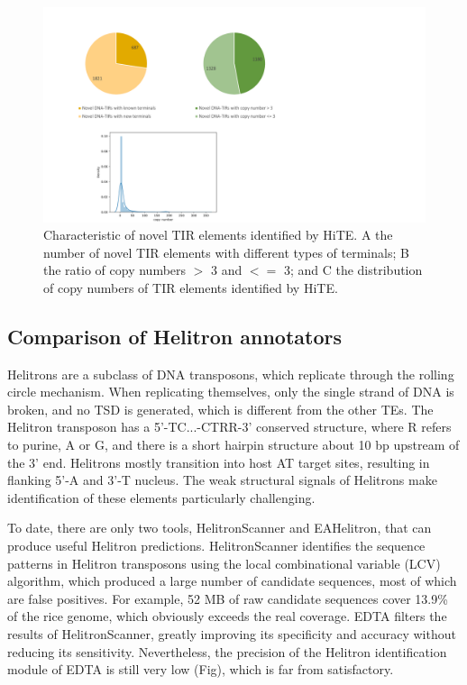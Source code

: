 \documentclass{bmcart}
\begin{document}
\begin{figure}[h!]
	\centerline{\includegraphics[width=1.0\textwidth]{figures/NovelTIRs.pdf}}
	\caption{Characteristic of novel TIR elements identified by HiTE. A the number of novel TIR elements with different types of terminals; B the ratio of copy numbers $>$ 3 and $<=$ 3; and C the distribution of copy numbers of TIR elements identified by HiTE.}
	\label{fig:novel_tirs}
\end{figure}

\subsection*{Comparison of Helitron annotators}
Helitrons are a subclass of DNA transposons, which replicate through the rolling circle mechanism. When replicating themselves, only the single strand of DNA is broken, and no TSD is generated, which is different from the other TEs. The Helitron transposon has a 5'-TC...-CTRR-3' conserved structure, where R refers to purine, A or G, and there is a short hairpin structure about 10 bp upstream of the 3' end. Helitrons mostly transition into host AT target sites, resulting in flanking 5'-A and 3'-T nucleus\cite{kapitonov2007helitrons}. The weak structural signals of Helitrons make identification of these elements particularly challenging.

To date, there are only two tools, HelitronScanner and EAHelitron, that can produce useful Helitron predictions. HelitronScanner identifies the sequence patterns in Helitron transposons using the local combinational variable (LCV) algorithm, which produced a large number of candidate sequences, most of which are false positives. For example, 52 MB of raw candidate sequences cover 13.9\% of the rice genome, which obviously exceeds the real coverage. EDTA filters the results of HelitronScanner, greatly improving its specificity and accuracy without reducing its sensitivity\cite{ou2019benchmarking}. Nevertheless, the precision of the Helitron identification module of EDTA is still very low (Fig), which is far from satisfactory.
\end{document}
